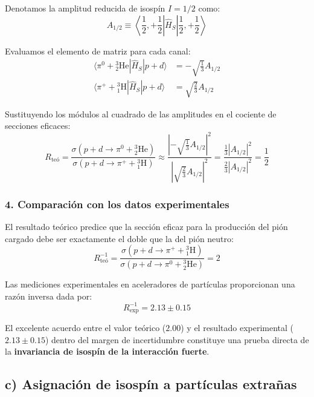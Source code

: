 Denotamos la amplitud reducida de isospín $I = 1/2$ como:
\begin{equation}
    A_{1/2} \equiv \left\langle \frac{1}{2}, +\frac{1}{2} \right| \hat{H}_S \left| \frac{1}{2}, +\frac{1}{2} \right\rangle
\end{equation}

Evaluamos el elemento de matriz para cada canal:
\begin{align}
    \langle \pi^0 + {^3_2\text{He}} | \hat{H}_S | p + d \rangle &= -\sqrt{\frac{1}{3}} A_{1/2} \\
    \langle \pi^+ + {^3_1\text{H}} | \hat{H}_S | p + d \rangle &= \sqrt{\frac{2}{3}} A_{1/2}
\end{align}

Sustituyendo los módulos al cuadrado de las amplitudes en el cociente de secciones eficaces:
\begin{equation}
    R_{\text{teó}} = \frac{\sigma(p + d \to \pi^0 + {^3_2\text{He}})}{\sigma(p + d \to \pi^+ + {^3_1\text{H}})} \approx \frac{\left| -\sqrt{\frac{1}{3}} A_{1/2} \right|^2}{\left| \sqrt{\frac{2}{3}} A_{1/2} \right|^2} = \frac{\frac{1}{3} |A_{1/2}|^2}{\frac{2}{3} |A_{1/2}|^2} = \frac{1}{2}
\end{equation}

\subsubsection*{4. Comparación con los datos experimentales}

El resultado teórico predice que la sección eficaz para la producción del pión cargado debe ser exactamente el doble que la del pión neutro:
\begin{equation}
    R_{\text{teó}}^{-1} = \frac{\sigma(p + d \to \pi^+ + {^3_1\text{H}})}{\sigma(p + d \to \pi^0 + {^3_2\text{He}})} = 2
\end{equation}

Las mediciones experimentales en aceleradores de partículas proporcionan una razón inversa dada por:
\begin{equation}
    R_{\text{exp}}^{-1} = 2.13 \pm 0.15
\end{equation}

El excelente acuerdo entre el valor teórico ($2.00$) y el resultado experimental ($2.13 \pm 0.15$) dentro del margen de incertidumbre constituye una prueba directa de la \textbf{invariancia de isospín de la interacción fuerte}.

\newpage
\subsection*{c) Asignación de isospín a partículas extrañas}

